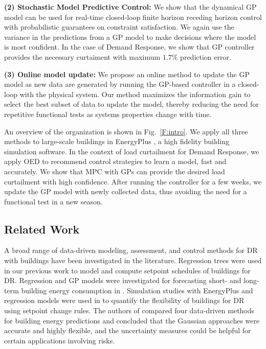 \noindent \textbf{(2) Stochastic Model Predictive Control:} We show that the dynamical GP model can be used for real-time closed-loop finite horizon receding horizon control with probabilistic guarantees on constraint satisfaction. We again use the variance in the predictions from a GP model to make decisions where the model is most confident. In the case of Demand Response, we show that GP controller provides the necessary curtaiment with maximum \(1.7\% \) prediction error.
	
\noindent \textbf{(3) Online model update:} We propose an online method to update the GP model as new data are generated by running the GP-based controller in a closed-loop with the physical system.
Our method maximizes the information gain to select the best subset of data to update the model, thereby reducing the need for repetitive functional tests as systems properties change with time.

An overview of the organization is shown in Fig.~\ref{F:intro}.
We apply all three methods to large-scale buildings in EnergyPlus \cite{Deru2011}, a high fidelity building simulation software.
In the context of load curtailment for Demand Response, we apply OED to recommend control strategies to learn a model, fast and accurately. We show that MPC with GPs can provide the desired load curtailment with high confidence. After running the controller for a few weeks, we update the GP model with newly collected data, thus avoiding the need for a functional test in a new season.


\subsection{Related Work}
A broad range of data-driven modeling, assessment, and control methods for DR with buildings have been investigated in the literature.
Regression trees were used in our previous work \cite{behletal15dradvisor,JainACC2017,JainCDC2017} to model and compute setpoint schedules of buildings for DR. 
Regression and GP models were investigated for forecasting short- and long-term building energy consumption in \cite{nohetal13data}.
Simulation studies with EnergyPlus and regression models were used in \cite{yinetal16quantifying} to quantify the flexibility of buildings for DR using setpoint change rules.
The authors of \cite{zhangetal15comparisons} compared four data-driven methods for building energy predictions and concluded that the Gaussian approaches were accurate and highly flexible, and the uncertainty measures could be helpful for certain applications involving risks.



